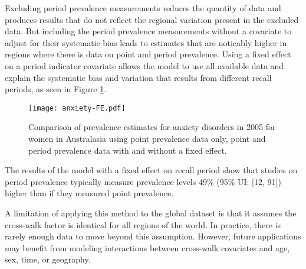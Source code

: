 Excluding period prevalence measurements reduces the quantity of data
and produces results that do not reflect the regional variation
present in the excluded data.  But including the period prevalence
measurements without a covariate to adjust for their systematic bias
leads to estimates that are noticably higher in regions where there is
data on point and period prevalence.  Using a fixed effect on a period
indicator covariate allows the model to use all available data and
explain the systematic bias and variation that results from different
recall periods, as seen in Figure \ref{fig:app-anxiety FE}.

    \begin{figure}[h]
        \begin{center}
            \texttt{[image: anxiety-FE.pdf]}
            \caption{Comparison of prevalence estimates for anxiety
              disorders in 2005 for women in Australasia using point
              prevalence data only, point and period prevalence data
              with and without a fixed effect.}
            \label{fig:app-anxiety FE}
        \end{center}
    \end{figure}

The results of the model with a fixed effect on recall period show
that studies on period prevalence typically measure prevalence levels
49\% (95\% UI: [12, 91]) higher than if they measured point
prevalence.

A limitation of applying this method to the global dataset is that it
assumes the cross-walk factor is identical for all regions of the
world.  In practice, there is rarely enough data to move beyond this
assumption.  However, future applications may benefit from modeling
interactions between cross-walk covariates and age, sex, time, or
geography.
